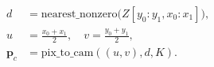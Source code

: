 \begin{align*}
    d &= \text{nearest\_nonzero}\bigl(Z[y_0:y_1, x_0:x_1]\bigr),\\
    u &= \tfrac{x_0+x_1}{2}, \quad v = \tfrac{y_0+y_1}{2},\\
    \mathbf{p}_c &= \text{pix\_to\_cam}((u,v), d, K).
\end{align*}
